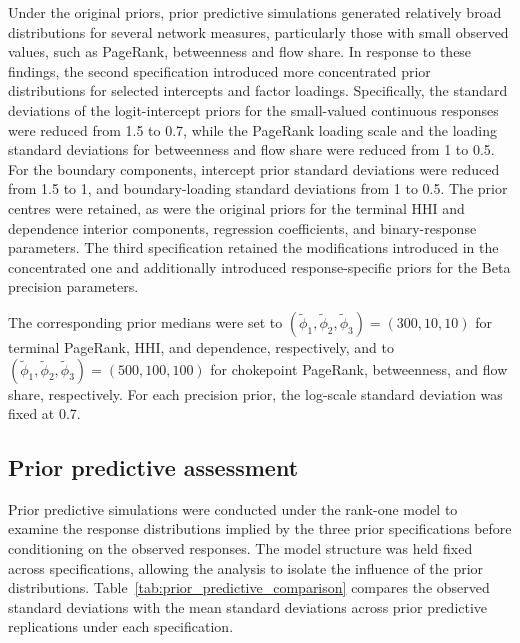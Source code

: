 \documentclass[pdftex,12pt,openright,a4paper,oneside]{book}
\begin{document}
Under the original priors, prior predictive simulations generated relatively broad
distributions for several network measures, particularly those with small
observed values, such as PageRank, betweenness and flow share.
In response to these findings, the second specification introduced more concentrated
prior distributions for selected intercepts and factor loadings. Specifically, the standard
deviations of the logit-intercept priors for the small-valued continuous responses
were reduced from 1.5 to 0.7, while the PageRank loading scale and the loading standard
deviations for betweenness and flow share were reduced from 1 to 0.5. For the
boundary components, intercept prior standard deviations were reduced from 1.5 to
1, and boundary-loading standard deviations from 1 to 0.5. The prior centres were
retained, as were the original priors for the terminal HHI and dependence interior
components, regression coefficients, and binary-response parameters.
The third specification retained the modifications introduced in the concentrated one
and additionally introduced response-specific priors for the Beta precision
parameters.

The corresponding prior medians were set to $(\tilde{\phi}_1, \tilde{\phi}_2, \tilde{\phi}_3) = (300, 10, 10)$ for terminal
PageRank, HHI, and dependence, respectively, and to $(\tilde{\phi}_1, \tilde{\phi}_2, \tilde{\phi}_3) = (500, 100, 100)$ for
chokepoint PageRank, betweenness, and flow share, respectively. For each precision
prior, the log-scale standard deviation was fixed at 0.7.

\subsection{Prior predictive assessment}
Prior predictive simulations were conducted under the rank-one model to examine the response 
distributions implied by the three prior specifications before conditioning on the observed responses. 
The model structure was held fixed across specifications, allowing the analysis to isolate the influence 
of the prior distributions. Table~\ref{tab:prior_predictive_comparison} compares the observed standard deviations with the mean 
standard deviations across prior predictive replications under each specification.
\end{document}
